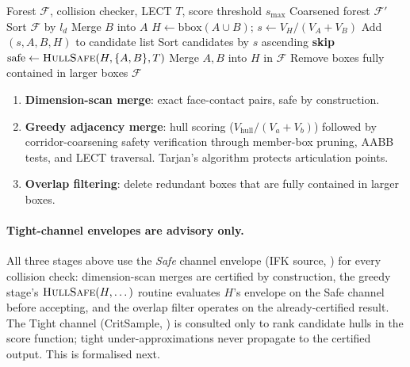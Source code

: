 \documentclass[journal]{IEEEtran}
\begin{document}
\begin{algorithm}[t]
\caption{Multi-Level Coarsening}\label{alg:coarsen}
\footnotesize
\begin{algorithmic}[1]
\REQUIRE Forest $\mathcal{F}$, collision checker, LECT $T$,
  score threshold $s_{\max}$
\ENSURE Coarsened forest $\mathcal{F}'$
\STATE {}
  \STATE Sort $\mathcal{F}$ by $l_d$
    \STATE Merge $B$ into $A$  \hfill{}
  \ENDFOR
\ENDFOR
\STATE {}
  \STATE $H \leftarrow \mathrm{bbox}(A \cup B)$;
    $s \leftarrow V_H / (V_A + V_B)$
    \STATE Add $(s, A, B, H)$ to candidate list
  \ENDIF
\ENDFOR
\STATE Sort candidates by $s$ ascending
    \STATE \textbf{skip}  \hfill{}
  \ENDIF
  \STATE $\text{safe} \leftarrow \textsc{HullSafe}(H, \{A,B\}, T)$
    \hfill{}
    \STATE Merge $A, B$ into $H$ in $\mathcal{F}$
  \ENDIF
\ENDFOR
\STATE Remove boxes fully contained in larger boxes
\RETURN $\mathcal{F}$
\end{algorithmic}
\end{algorithm}

\begin{enumerate}[nosep]
  \item \textbf{Dimension-scan merge}: exact face-contact pairs, safe by
    construction.
  \item \textbf{Greedy adjacency merge}: hull scoring
    ($V_\text{hull}/(V_a+V_b)$) followed by corridor-coarsening safety
    verification through member-box pruning, AABB tests, and LECT
    traversal. Tarjan's algorithm protects articulation points.
  \item \textbf{Overlap filtering}: delete redundant boxes that are fully
    contained in larger boxes.
\end{enumerate}

\paragraph{Tight-channel envelopes are advisory only.}
All three stages above use the \emph{Safe} channel envelope (IFK source,
) for every collision check: dimension-scan merges are
certified by construction, the greedy stage's $\textsc{HullSafe}(H,\dots)$
routine evaluates $H$'s envelope on the Safe channel before accepting,
and the overlap filter operates on the already-certified result. The
Tight channel (CritSample, ) is consulted only to
rank candidate hulls in the score function; tight under-approximations
never propagate to the certified output. This is formalised next.
\end{document}
